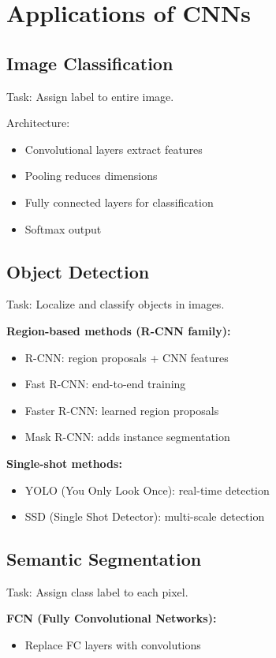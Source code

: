 
\section{Applications of CNNs}
\label{sec:cnn-applications}

\subsection{Image Classification}

Task: Assign label to entire image.

Architecture:
\begin{itemize}
    \item Convolutional layers extract features
    \item Pooling reduces dimensions
    \item Fully connected layers for classification
    \item Softmax output
\end{itemize}

\subsection{Object Detection}

Task: Localize and classify objects in images.

\textbf{Region-based methods (R-CNN family):}
\begin{itemize}
    \item R-CNN: region proposals + CNN features
    \item Fast R-CNN: end-to-end training
    \item Faster R-CNN: learned region proposals
    \item Mask R-CNN: adds instance segmentation
\end{itemize}

\textbf{Single-shot methods:}
\begin{itemize}
    \item YOLO (You Only Look Once): real-time detection
    \item SSD (Single Shot Detector): multi-scale detection
\end{itemize}

\subsection{Semantic Segmentation}

Task: Assign class label to each pixel.

\textbf{FCN (Fully Convolutional Networks):}
\begin{itemize}
    \item Replace FC layers with convolutions
\end{itemize}
